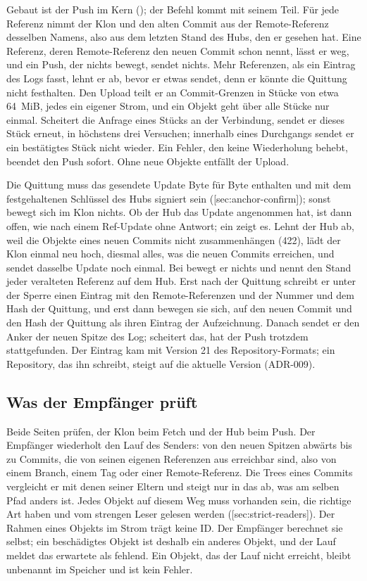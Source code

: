 Gebaut ist der Push im Kern (); der Befehl kommt mit seinem Teil.
Für jede Referenz nimmt der Klon  und den alten Commit aus der Remote-Referenz
desselben Namens, also aus dem letzten Stand des Hubs, den er gesehen hat.
Eine Referenz, deren Remote-Referenz den neuen Commit schon nennt, lässt er weg, und ein Push,
der nichts bewegt, sendet nichts.
Mehr Referenzen, als ein Eintrag  des Logs fasst, lehnt er ab, bevor er etwas sendet,
denn er könnte die Quittung nicht festhalten.
Den Upload teilt er an Commit-Grenzen in Stücke von etwa 64~MiB, jedes ein eigener Strom, und ein
Objekt geht über alle Stücke nur einmal.
Scheitert die Anfrage eines Stücks an der Verbindung, sendet er dieses Stück erneut,
in höchstens drei Versuchen; innerhalb eines Durchgangs sendet er ein bestätigtes Stück nicht
wieder.
Ein Fehler, den keine Wiederholung behebt, beendet den Push sofort.
Ohne neue Objekte entfällt der Upload.

Die Quittung muss das gesendete Update Byte für Byte enthalten und mit dem festgehaltenen
Schlüssel des Hubs signiert sein ([sec:anchor-confirm]); sonst bewegt sich im Klon
nichts.
Ob der Hub das Update angenommen hat, ist dann offen, wie nach einem Ref-Update ohne Antwort;
ein  zeigt es.
Lehnt der Hub ab, weil die Objekte eines neuen Commits nicht zusammenhängen (422), lädt der Klon
einmal neu hoch, diesmal alles, was die neuen Commits erreichen, und sendet dasselbe Update
noch einmal.
Bei  bewegt er nichts und nennt den Stand jeder veralteten Referenz auf dem Hub.
Erst nach der Quittung schreibt er unter der Sperre einen Eintrag  mit den
Remote-Referenzen und der Nummer und dem Hash der Quittung, und erst dann bewegen sie sich, auf
den neuen Commit und den Hash der Quittung als ihren Eintrag der Aufzeichnung.
Danach sendet er den Anker der neuen Spitze des Log; scheitert das, hat der Push trotzdem
stattgefunden.
Der Eintrag  kam mit Version 21 des Repository-Formats; ein Repository, das ihn
schreibt, steigt auf die aktuelle Version (ADR-009).

\subsection{Was der Empfänger prüft}

Beide Seiten prüfen, der Klon beim Fetch und der Hub beim Push.
Der Empfänger wiederholt den Lauf des Senders: von den neuen Spitzen abwärts bis zu Commits, die
von seinen eigenen Referenzen aus erreichbar sind, also von einem Branch, einem Tag oder einer
Remote-Referenz.
Die Trees eines Commits vergleicht er mit denen seiner Eltern und steigt nur in das ab, was am
selben Pfad anders ist.
Jedes Objekt auf diesem Weg muss vorhanden sein, die richtige Art haben und vom strengen Leser
gelesen werden ([sec:strict-readers]).
Der Rahmen eines Objekts im Strom trägt keine ID.
Der Empfänger berechnet sie selbst; ein beschädigtes Objekt ist deshalb ein anderes Objekt, und
der Lauf meldet das erwartete als fehlend.
Ein Objekt, das der Lauf nicht erreicht, bleibt unbenannt im Speicher und ist kein Fehler.

